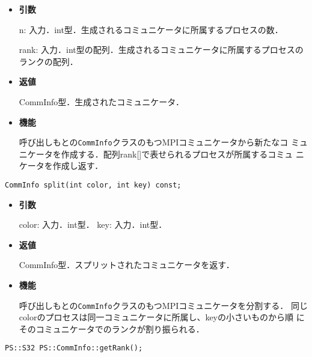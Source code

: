 \begin{itemize}

\item {\bf 引数}

n: 入力．int型．生成されるコミュニケータに所属するプロセスの数．

rank: 入力．int型の配列．生成されるコミュニケータに所属するプロセスのランクの配列．

\item {\bf 返値}

CommInfo型．生成されたコミュニケータ．

\item {\bf 機能}

呼び出しもとの{\tt CommInfo}クラスのもつMPIコミュニケータから新たなコ
ミュニケータを作成する．配列rank[]で表せられるプロセスが所属するコミュ
ニケータを作成し返す．

\end{itemize}

\begin{screen}
\begin{verbatim}
CommInfo split(int color, int key) const;
\end{verbatim}
\end{screen}

\begin{itemize}

\item {\bf 引数}

color: 入力．int型．
key: 入力．int型．

\item {\bf 返値}

CommInfo型．スプリットされたコミュニケータを返す．

\item {\bf 機能}

呼び出しもとの{\tt CommInfo}クラスのもつMPIコミュニケータを分割する．
同じcolorのプロセスは同一コミュニケータに所属し、keyの小さいものから順
にそのコミュニケータでのランクが割り振られる．

\end{itemize}




\begin{screen}
\begin{verbatim}
PS::S32 PS::CommInfo::getRank();
\end{verbatim}
\end{screen}

